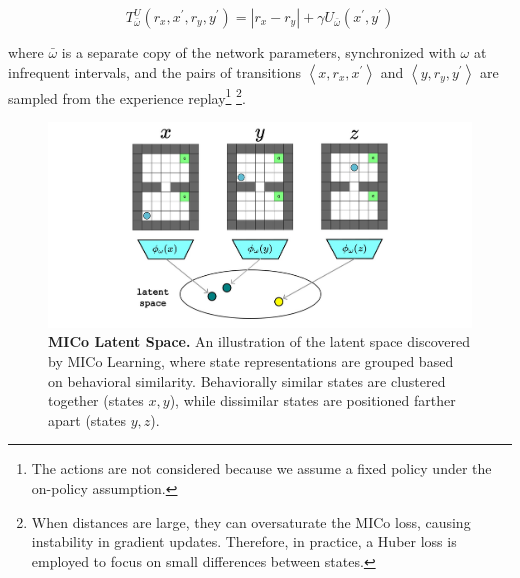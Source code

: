 \begin{equation}
    T_{\bar{\omega}}^U\left(r_x, x^{\prime}, r_y, y^{\prime}\right)=\left|r_x-r_y\right|+\gamma U_{\bar{\omega}}\left(x^{\prime}, y^{\prime}\right)
\end{equation}

where \(\bar{\omega}\) is a separate copy of the network parameters, synchronized with \(\omega\) at infrequent intervals, and the pairs of transitions \(\left\langle x, r_x, x^{\prime}\right\rangle\) and \(\left\langle y, r_y, y^{\prime}\right\rangle\) are sampled from the experience replay\footnote{The actions are not considered because we assume a fixed policy under the on-policy assumption.} \footnote{When distances are large, they can oversaturate the MICo loss, causing instability in gradient updates. Therefore, in practice, a Huber loss is employed to focus on small differences between states.}.

\begin{figure}[H]
    \centering
    \includegraphics[width=1\linewidth]{Figures/latent_space.jpg}
    \caption[MICo Latent Space]{\textbf{MICo Latent Space.} An illustration of the latent space discovered by MICo Learning, where state representations are grouped based on behavioral similarity. Behaviorally similar states are clustered together (states $x, y$), while dissimilar states are positioned farther apart (states $y, z$).}
    \label{fig:latent_space}
\end{figure}

